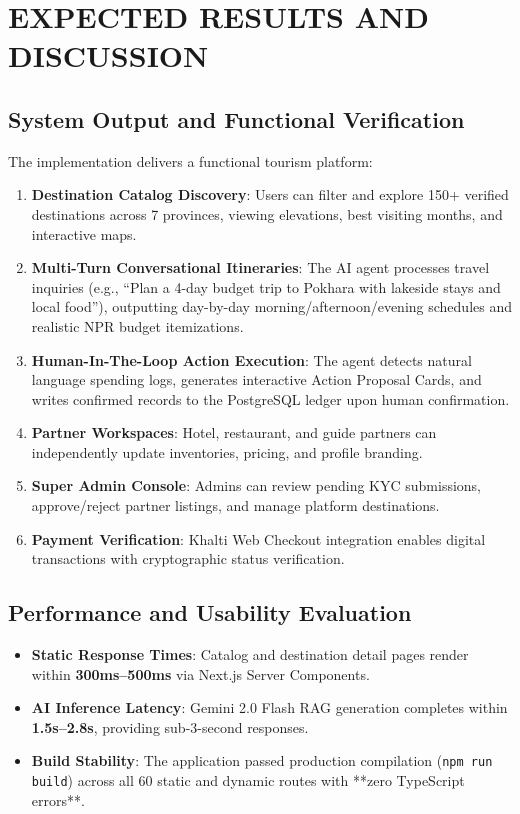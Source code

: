 \documentclass[12pt,a4paper]{report}
\begin{document}
\chapter{EXPECTED RESULTS AND DISCUSSION}

\section{System Output and Functional Verification}
The implementation delivers a functional tourism platform:
\begin{enumerate}
    \item \textbf{Destination Catalog Discovery}: Users can filter and explore 150+ verified destinations across 7 provinces, viewing elevations, best visiting months, and interactive maps.
    \item \textbf{Multi-Turn Conversational Itineraries}: The AI agent processes travel inquiries (e.g., ``Plan a 4-day budget trip to Pokhara with lakeside stays and local food''), outputting day-by-day morning/afternoon/evening schedules and realistic NPR budget itemizations.
    \item \textbf{Human-In-The-Loop Action Execution}: The agent detects natural language spending logs, generates interactive Action Proposal Cards, and writes confirmed records to the PostgreSQL ledger upon human confirmation.
    \item \textbf{Partner Workspaces}: Hotel, restaurant, and guide partners can independently update inventories, pricing, and profile branding.
    \item \textbf{Super Admin Console}: Admins can review pending KYC submissions, approve/reject partner listings, and manage platform destinations.
    \item \textbf{Payment Verification}: Khalti Web Checkout integration enables digital transactions with cryptographic status verification.
\end{enumerate}

\section{Performance and Usability Evaluation}
\begin{itemize}
    \item \textbf{Static Response Times}: Catalog and destination detail pages render within \textbf{300ms--500ms} via Next.js Server Components.
    \item \textbf{AI Inference Latency}: Gemini 2.0 Flash RAG generation completes within \textbf{1.5s--2.8s}, providing sub-3-second responses.
    \item \textbf{Build Stability}: The application passed production compilation (\texttt{npm run build}) across all 60 static and dynamic routes with **zero TypeScript errors**.
\end{itemize}
\end{document}
